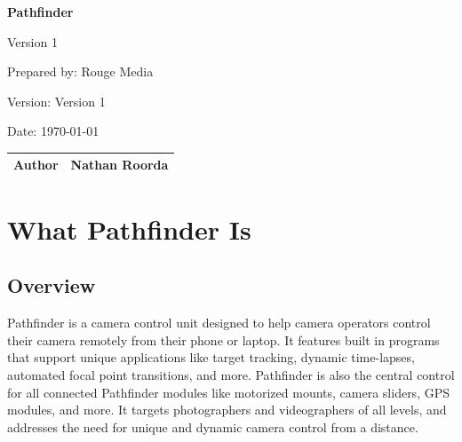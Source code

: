 \documentclass[11pt,a4paper]{article}
\newcommand{\productname}{Pathfinder}
\newcommand{\companyname}{Rouge Media}
\newcommand{\docversion}{Version 1}
\begin{document}
\begin{titlepage}
    \centering
    \vspace*{2cm}
    {\Huge\bfseries\color{primary} \productname\par}
    \vspace{0.5cm}
    {\LARGE Version 1\par}
    \vspace{1.5cm}
    {\large Prepared by: \companyname\par}
    {\large Version: \docversion\par}
    {\large Date: \today\par}
    \vfill
    \begin{tabular}{ll}
        \toprule
        \textbf{Author}   & Nathan Roorda \\
        \bottomrule
    \end{tabular}
    \vspace{2cm}
\end{titlepage}

\tableofcontents
\newpage

\section{What Pathfinder Is}

\subsection{Overview}
\productname{} is a camera control unit designed to help camera operators control their camera remotely from their phone or laptop. It features built in programs that support unique applications like target tracking, dynamic time-lapses, automated focal point transitions, and more. Pathfinder is also the central control for all connected Pathfinder modules like motorized mounts, camera sliders, GPS modules, and more. It targets photographers and videographers of all levels, and addresses the need for unique and dynamic camera control from a distance.
\end{document}
